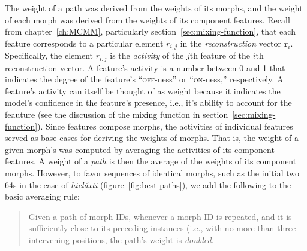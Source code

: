 {The weight of a path was derived from
 the weights of its morphs, and the weight of each morph was derived from the weights of its component features. 
Recall from chapter~\ref{ch:MCMM}, particularly section~\ref{sec:mixing-function}, that each feature corresponds 
to a particular element $r_{i,j}$ in the \emph{reconstruction} 
vector $\mathbf{r}_{i}$. Specifically, the element $r_{i,j}$ is the \emph{activity} 
of the $j$th feature of the $i$th reconstruction vector. A feature's 
activity is a number between 0 and 1 that indicates the degree of the 
feature's ``\textsc{off}-ness'' or ``\textsc{on}-ness,'' respectively. A 
feature's activity can itself be thought of as weight because it indicates 
the model's confidence in the feature's presence, i.e., it's ability to 
account for the feauture (see the discussion of the mixing function in section~\ref{sec:mixing-function}). 
Since features compose morphs, the activities of individual features served as base cases for deriving the weights of morphs. That is, the weight of a given morph's was computed by averaging the activities of its component features. 
A weight of a \emph{path} is then the average of the weights of its component morphs. However, to favor 
sequences of identical morphs, such as the initial two 64s in the case of \textit{hicl\'{a}xti} (figure~\ref{fig:best-paths}), 
we add the following to the basic averaging rule: 
\begin{quote}\noindent
Given a path of morph IDs, 
whenever a morph ID is repeated, and it is sufficiently close to its preceding instances (i.e., with no more than three intervening positions, the path's weight is \emph{doubled}.
\end{quote}

}
